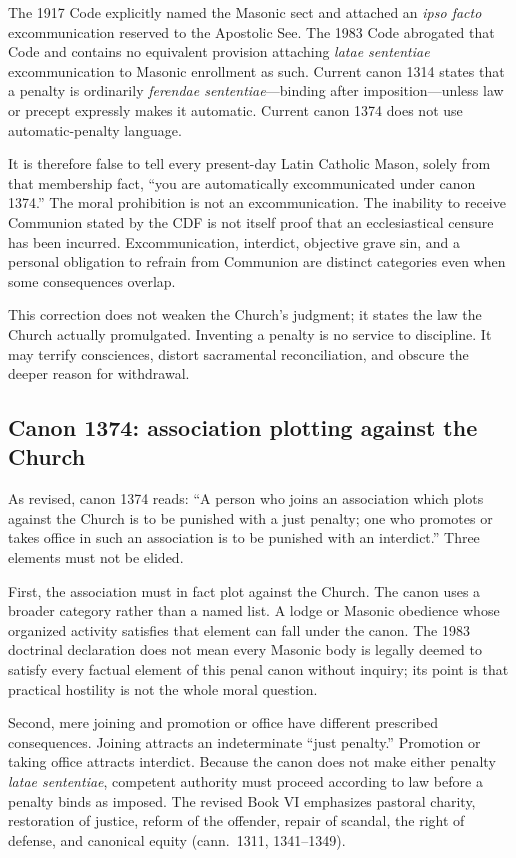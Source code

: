 The 1917 Code explicitly named the Masonic sect and attached an \emph{ipso facto} excommunication reserved to the Apostolic See. The 1983 Code abrogated that Code and contains no equivalent provision attaching \emph{latae sententiae} excommunication to Masonic enrollment as such. Current canon 1314 states that a penalty is ordinarily \emph{ferendae sententiae}---binding after imposition---unless law or precept expressly makes it automatic. Current canon 1374 does not use automatic-penalty language.

It is therefore false to tell every present-day Latin Catholic Mason, solely from that membership fact, “you are automatically excommunicated under canon 1374.” The moral prohibition is not an excommunication. The inability to receive Communion stated by the CDF is not itself proof that an ecclesiastical censure has been incurred. Excommunication, interdict, objective grave sin, and a personal obligation to refrain from Communion are distinct categories even when some consequences overlap.

This correction does not weaken the Church's judgment; it states the law the Church actually promulgated. Inventing a penalty is no service to discipline. It may terrify consciences, distort sacramental reconciliation, and obscure the deeper reason for withdrawal.

\subsection{Canon 1374: association plotting against the Church}

As revised, canon 1374 reads: “A person who joins an association which plots against the Church is to be punished with a just penalty; one who promotes or takes office in such an association is to be punished with an interdict.” Three elements must not be elided.

First, the association must in fact plot against the Church. The canon uses a broader category rather than a named list. A lodge or Masonic obedience whose organized activity satisfies that element can fall under the canon. The 1983 doctrinal declaration does not mean every Masonic body is legally deemed to satisfy every factual element of this penal canon without inquiry; its point is that practical hostility is not the whole moral question.

Second, mere joining and promotion or office have different prescribed consequences. Joining attracts an indeterminate “just penalty.” Promotion or taking office attracts interdict. Because the canon does not make either penalty \emph{latae sententiae}, competent authority must proceed according to law before a penalty binds as imposed. The revised Book VI emphasizes pastoral charity, restoration of justice, reform of the offender, repair of scandal, the right of defense, and canonical equity (cann.~1311, 1341--1349).

